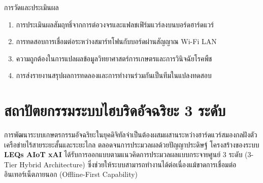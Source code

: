 \begin{planbox}{การวัดและประเมินผล}
\begin{enumerate}[topsep=2pt, itemsep=1pt, partopsep=0pt, parsep=0pt, leftmargin=1.5em]
    \item การประเมินผลสัมฤทธิ์จากการต่อวงจรและแฟลชเฟิร์มแวร์ลงบนบอร์ดฮาร์ดแวร์
    \item การทดสอบการเชื่อมต่อระหว่างสมาร์ทโฟนกับบอร์ดผ่านสัญญาณ Wi-Fi LAN
    \item ความถูกต้องในการแปลผลข้อมูลวิทยาศาสตร์การเกษตรและการวินิจฉัยโรคพืช
    \item การส่งรายงานสรุปผลการทดลองและการทำงานร่วมกันเป็นทีมในแปลงทดสอบ
\end{enumerate}
\end{planbox}

\clearpage

\section{สถาปัตยกรรมระบบไฮบริดอัจฉริยะ 3 ระดับ}

การพัฒนาระบบเกษตรกรรมอัจฉริยะในยุคดิจิทัลจำเป็นต้องผสมผสานระหว่างฮาร์ดแวร์สมองกลฝังตัว เครือข่ายไร้สายระยะสั้นและระยะไกล ตลอดจนการประมวลผลด้วยปัญญาประดิษฐ์ โครงสร้างของระบบ \textbf{LEQs AIoT xAI} ได้รับการออกแบบตามแนวคิดการประมวลผลแบบกระจายศูนย์ 3 ระดับ (3-Tier Hybrid Architecture) ซึ่งช่วยให้ระบบสามารถทำงานได้ต่อเนื่องแม้ขาดการเชื่อมต่ออินเทอร์เน็ตภายนอก (Offline-First Capability)

